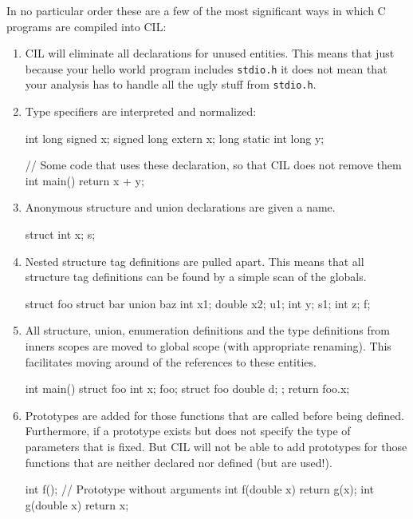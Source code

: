 \documentclass[letterpaper]{article}
\def\t#1{{\tt #1}}
\begin{document}
 In no particular order these are a few of the most significant ways in which
C programs are compiled into CIL:
\begin{enumerate}
\item CIL will eliminate all declarations for unused entities. This means that
just because your hello world program includes \t{stdio.h} it does not mean
that your analysis has to handle all the ugly stuff from \t{stdio.h}.

\item Type specifiers are interpreted and normalized:
\begin{cilcode}[global]
int long signed x;
signed long extern x;
long static int long y;

// Some code that uses these declaration, so that CIL does not remove them
int main() { return x + y; }
\end{cilcode}

\item Anonymous structure and union declarations are given a name. 
\begin{cilcode}[global]
 struct { int x; } s;
\end{cilcode}

\item Nested structure tag definitions are pulled apart. This means that all
structure tag definitions can be found by a simple scan of the globals.

\begin{cilcode}[global]
struct foo {
   struct bar {
      union baz { 
          int x1; 
          double x2;
      } u1;
      int y;
   } s1;
   int z;
} f;
\end{cilcode}

\item All structure, union, enumeration definitions and the type definitions
from inners scopes are moved to global scope (with appropriate renaming). This
facilitates moving around of the references to these entities.

\begin{cilcode}[global]
int main() {
  struct foo { 
        int x; } foo; 
  {
     struct foo { 
        double d;
     };
     return foo.x;
  }      
}
\end{cilcode}

\item Prototypes are added for those functions that are called before being
defined. Furthermore, if a prototype exists but does not specify the type of
parameters that is fixed. But CIL will not be able to add prototypes for those
functions that are neither declared nor defined (but are used!).
\begin{cilcode}[global]
  int f();  // Prototype without arguments
  int f(double x) {
      return g(x);
  }
  int g(double x) {
     return x;
  } 
\end{cilcode}


\end{enumerate}
\end{document}
